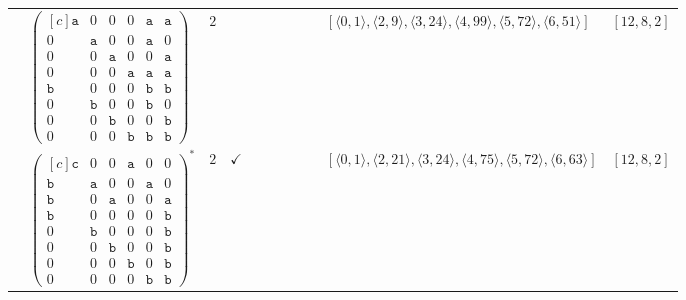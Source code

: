 \documentclass[12pt]{article}
\theoremstyle{definition}
\theoremstyle{plain}
\begin{document}
{\begin{longtable}{@{}cYcccccccZc@{}}
& $\begin{pmatrix*}[c]
\mathtt{a}  &  0  &  0  &  0  &  \mathtt{a}  &  \mathtt{a}  \\
0  &  \mathtt{a}  &  0  &  0  &  \mathtt{a}  &  0  \\
0  &  0  &  \mathtt{a}  &  0  &  0  &  \mathtt{a}  \\
0  &  0  &  0  &  \mathtt{a}  &  \mathtt{a}  &  \mathtt{a}  \\
\mathtt{b}  &  0  &  0  &  0  &  \mathtt{b}  &  \mathtt{b}  \\
0  &  \mathtt{b}  &  0  &  0  &  \mathtt{b}  &  0  \\
0  &  0  &  \mathtt{b}  &  0  &  0  &  \mathtt{b}  \\
0  &  0  &  0  &  \mathtt{b}  &  \mathtt{b}  &  \mathtt{b}
\end{pmatrix*}$
& $2$
&
&
&
&
&
&
& $[\langle0,1\rangle,\allowbreak\langle2,9\rangle,\allowbreak\langle3,24\rangle,\allowbreak\langle4,99\rangle,\allowbreak\langle5,72\rangle,\allowbreak\langle6,51\rangle]$
& $[12,8,2]$\\

\cmidrule(lr){2-11}

& $\begin{pmatrix*}[c]
\mathtt{c}  &  0  &  0  &  \mathtt{a}  &  0  &  0  \\
\mathtt{b}  &  \mathtt{a}  &  0  &  0  &  \mathtt{a}  &  0  \\
\mathtt{b}  &  0  &  \mathtt{a}  &  0  &  0  &  \mathtt{a}  \\
\mathtt{b}  &  0  &  0  &  0  &  0  &  \mathtt{b}  \\
0  &  \mathtt{b}  &  0  &  0  &  0  &  \mathtt{b}  \\
0  &  0  &  \mathtt{b}  &  0  &  0  &  \mathtt{b}  \\
0  &  0  &  0  &  \mathtt{b}  &  0  &  \mathtt{b}  \\
0  &  0  &  0  &  0  &  \mathtt{b}  &  \mathtt{b}
\end{pmatrix*}^*$
& $2$
& $\checkmark$
&
&
&
&
&
& $[\langle0,1\rangle,\allowbreak\langle2,21\rangle,\allowbreak\langle3,24\rangle,\allowbreak\langle4,75\rangle,\allowbreak\langle5,72\rangle,\allowbreak\langle6,63\rangle]$
& $[12,8,2]$\\

\cmidrule(lr){2-11}


\end{longtable}}
\end{document}
